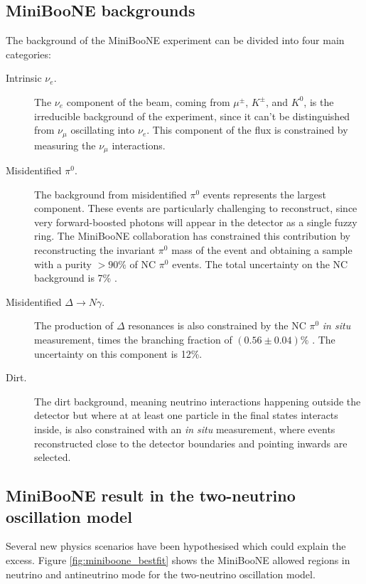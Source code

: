 \subsection*{MiniBooNE backgrounds}
The background of the MiniBooNE experiment can be divided into four main categories:
\begin{description}
    \item[Intrinsic $\nu_e$.] The $\nu_e$ component of the beam, coming from $\mu^{\pm}$, $K^{\pm}$, and $K^0$, is the irreducible background of the experiment, since it can't be distinguished from $\nu_{\mu}$ oscillating into $\nu_{e}$. This component of the flux is constrained by measuring the $\nu_{\mu}$ interactions.
    \item[Misidentified $\pi^0$.] The background from misidentified $\pi^0$ events represents the largest component. These events are particularly challenging to reconstruct, since very forward-boosted photons will appear in the detector as a single fuzzy ring. The MiniBooNE collaboration has constrained this contribution by reconstructing the invariant $\pi^0$ mass of the event and obtaining a sample with a purity $>90\%$ of NC $\pi^0$ events. The total uncertainty on the NC background is 7\% \cite{Karagiorgi:2010zz}.
    \item[Misidentified $\Delta\rightarrow N\gamma$.] The production of $\Delta$ resonances is also constrained by the NC $\pi^0$ \emph{in situ} measurement, times the branching fraction of $(0.56\pm0.04)\%$ \cite{PhysRevD.98.030001}. The uncertainty on this component is 12\%.
    \item[Dirt.] The dirt background, meaning neutrino interactions happening outside the detector but where at at least one particle in the final states interacts inside, is also constrained with an \emph{in situ} measurement, where events reconstructed close to the detector boundaries and pointing inwards are selected. 
\end{description}


\subsection*{MiniBooNE result in the two-neutrino oscillation model}

Several new physics scenarios have been hypothesised which could explain the excess. Figure \ref{fig:miniboone_bestfit} shows the MiniBooNE allowed regions in neutrino and antineutrino mode for the two-neutrino oscillation model. 

